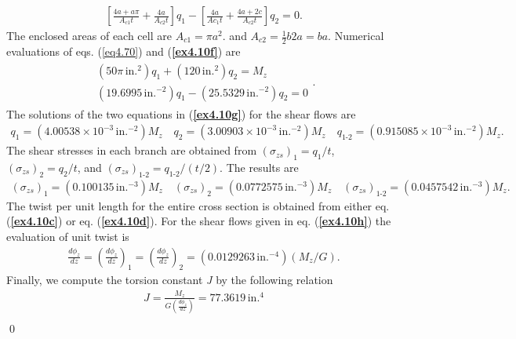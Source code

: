 \documentclass{AeroStructure-ERJohnson}
\begin{document}
\begin{example*}
\begin{align}
\left[\frac{4 a+a \pi}{A_{c 1} t}+\frac{4 a}{A_{c 2} t}\right] q_{1}-\left[\frac{4 a}{A c_{1} t}+\frac{4 a+2 c}{A_{c 2} t}\right] q_{2}=0.\tag{f}
\end{align}
The enclosed areas of each cell are $A_{c 1}=\pi a^{2}$. and $A_{c 2}=\frac{1}{2} b 2 a=b a$. Numerical evaluations of eqs. (\ref{eq4.70}) and (\textbf{\ref{ex4.10f}}) are
\begin{align}\label{ex4.10g}
\begin{gathered}(50 \pi\,\textrm{in}.^{2}) q_{1}+(120\,\textrm{in}.^{2}) q_{2}=M_{z} \\
(19.6995\,\textrm{in}.^{-2}) q_{1}-(25.5329\,\textrm{in}.^{-2}) q_{2}=0\tag{g}\end{gathered}.
\end{align}
The solutions of the two equations in (\textbf{\ref{ex4.10g}}) for the shear flows are
\begin{align}\label{ex4.10h}
q_{1}=(4.00538 \times 10^{-3}\,\textrm{in}.^{-2}) M_{z} \quad q_{2}=(3.00903 \times 10^{-3}\,\textrm{in}.^{-2}) M_{z} \quad q_{\textrm{1-2}}=(0.915085 \times 10^{-3}\,\textrm{in}.^{-2}) M_{z}.\tag{h}
\end{align}
The shear stresses in each branch are obtained from $\left(\sigma_{z s}\right)_{1}=q_{1}/t$, $\left(\sigma_{z s}\right)_{2}=q_{2}/t$, and $\left(\sigma_{z s}\right)_{\textrm{1-2}}=q_{\textrm{1-2}} /(t/2)$. The results are
\begin{align}\label{ex4.10i}
(\sigma_{z s})_{1}=(0.100135\,\textrm{in}.^{-3}) M_{z} \quad(\sigma_{z s})_{2}=(0.0772575\,\textrm{in}.^{-3}) M_{z} \quad(\sigma_{z s})_{\textrm{1-2}}=(0.0457542\,\textrm{in}.^{-3}) M_{z}.\tag{i}
\end{align}
The twist per unit length for the entire cross section is obtained from either eq. (\textbf{\ref{ex4.10c}}) or eq. (\textbf{\ref{ex4.10d}}). For the shear flows given in eq. (\textbf{\ref{ex4.10h}}) the evaluation of unit twist is
\begin{align}\label{ex4.10j}
\frac{d \phi_{z}}{d z}=\left(\frac{d \phi_{z}}{d z}\right)_{1}=\left(\frac{d \phi_{z}}{d z}\right)_{2}=(0.0129263\,\textrm{in}.^{-4})(M_{z}/G).\tag{j}
\end{align}
Finally, we compute the torsion constant \textit{J} by the following relation
\begin{align}\label{ex4.10k}
J=\frac{M_{z}}{G\left(\frac{d \phi_{z}}{d z}\right)}=77.3619\,\textrm{in}.^{4}\tag{k}\\[-30pt]
\ \nonumber
\end{align}\hfill\qed
\end{example*}
\end{document}
